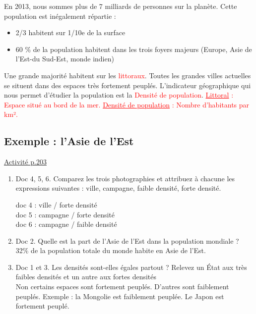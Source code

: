 \documentclass{beamer}
\begin{document}
\begin{frame}
\setlength{\parindent}{1cm} En 2013, nous sommes plus de 7 milliards de personnes sur la planète. Cette population est inégalement répartie : 
\begin{itemize}
\item 2/3 habitent sur 1/10e de la surface
\item 60 \% de la population habitent dans les trois foyers majeurs (Europe, Asie de l'Est-du Sud-Est, monde indien)
\end{itemize} 
Une grande majorité habitent sur les \textcolor{red}{littoraux}. Toutes les grandes villes actuelles se situent dans des espaces très fortement peuplés. L'indicateur géographique qui nous permet d'étudier la population est la \textcolor{red}{Densité de population}.
\vfill\textcolor{red}{\underline{Littoral} : Espace situé au bord de la mer.}
\vfill\textcolor{red}{\underline{Densité de population} : Nombre d'habitants par km².}
\end{frame}

\subsection{Exemple : l'Asie de l'Est}

\begin{frame}
\underline{Activité p.203}
\begin{enumerate}
\item Doc 4, 5, 6. Comparez les trois photographies et attribuez à chacune les expressions suivantes : ville, campagne, faible densité, forte densité.

\pause \textcolor{black!70!green}{doc 4 : ville / forte densité \\ doc 5 : campagne / forte densité \\doc 6 : campagne / faible densité}

\item Doc 2. Quelle est la part de l'Asie de l'Est dans la population mondiale ?\\

\pause \textcolor{black!70!green}{32\% de la population totale du monde habite en Asie de l'Est.}

\item Doc 1 et 3. Les densités sont-elles égales partout ? Relevez un État aux très faibles densités et un autre aux fortes densités\\

\pause \textcolor{black!70!green}{Non certains espaces sont fortement peuplés. D'autres sont faiblement peuplés. Exemple : la Mongolie est faiblement peuplée. Le Japon est fortement peuplé.}
\end{enumerate}
\end{frame}
\end{document}
